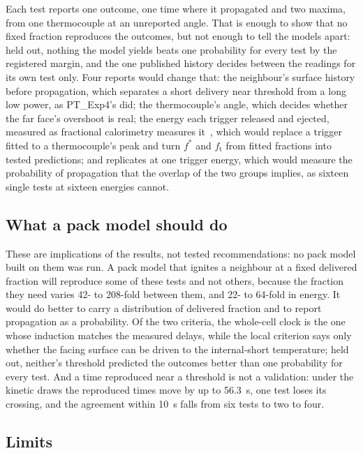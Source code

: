\documentclass[preprint,12pt]{elsarticle}
\newcommand{\fs}{f^{*}}
\newcommand{\ft}{f_{\mathrm{t}}}
\begin{document}
Each test reports one outcome, one time where it propagated and two maxima, from one thermocouple at an unreported angle. That is enough to show that no fixed fraction reproduces the outcomes, but not enough to tell the models apart: held out, nothing the model yields beats one probability for every test by the registered margin, and the one published history decides between the readings for its own test only. Four reports would change that: the neighbour's surface history before propagation, which separates a short delivery near threshold from a long low power, as PT\_Exp4's did; the thermocouple's angle, which decides whether the far face's overshoot is real; the energy each trigger released and ejected, measured as fractional calorimetry measures it~\cite{walker2019decoupling,finegan2024databank}, which would replace a trigger fitted to a thermocouple's peak and turn $\fs$ and $\ft$ from fitted fractions into tested predictions; and replicates at one trigger energy, which would measure the probability of propagation that the overlap of the two groups implies, as sixteen single tests at sixteen energies cannot.

\subsection{What a pack model should do}
\label{sec:disc-pack}

These are implications of the results, not tested recommendations: no pack model built on them was run. A pack model that ignites a neighbour at a fixed delivered fraction will reproduce some of these tests and not others, because the fraction they need varies 42- to 208-fold between them, and 22- to 64-fold in energy. It would do better to carry a distribution of delivered fraction and to report propagation as a probability. Of the two criteria, the whole-cell clock is the one whose induction matches the measured delays, while the local criterion says only whether the facing surface can be driven to the internal-short temperature; held out, neither's threshold predicted the outcomes better than one probability for every test. And a time reproduced near a threshold is not a validation: under the kinetic draws the reproduced times move by up to 56.3~s, one test loses its crossing, and the agreement within 10~s falls from six tests to two to four.

\subsection{Limits}
\label{sec:limits}
\end{document}
